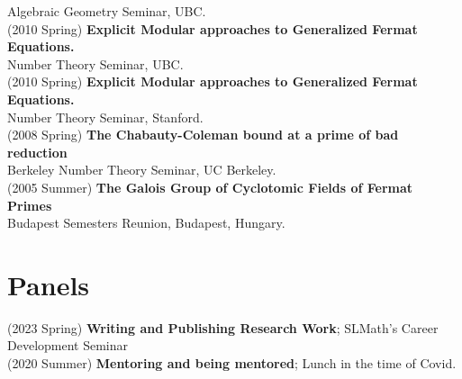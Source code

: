 \documentclass[margin,line]{res}
\begin{document}
\begin{resume}
Algebraic Geometry Seminar, UBC.
\vspace{.05cm}\\
(2010 Spring) \textbf{Explicit Modular approaches to Generalized Fermat Equations.}\\
 Number Theory Seminar, UBC.
\vspace{.05cm}\\
(2010 Spring) \textbf{Explicit Modular approaches to Generalized Fermat Equations.}\\
 Number Theory Seminar, Stanford.
\vspace{.05cm}\\
(2008 Spring) \textbf{The Chabauty-Coleman bound at a prime of bad reduction}\\
 Berkeley Number Theory Seminar, UC Berkeley.
\vspace{.05cm}\\
(2005 Summer) \textbf{The Galois Group of Cyclotomic Fields of Fermat Primes}\\
Budapest Semesters Reunion, Budapest, Hungary. 
\vspace{.05cm}\\
  
  
\section{\sc Panels}
(2023 Spring) \textbf{ Writing and Publishing Research Work};
SLMath's Career Development Seminar
\vspace{.05cm}\\  
(2020 Summer) \textbf{Mentoring and being mentored};
Lunch in the time of Covid. 
\vspace{.05cm}\\


\end{resume}
\end{document}
